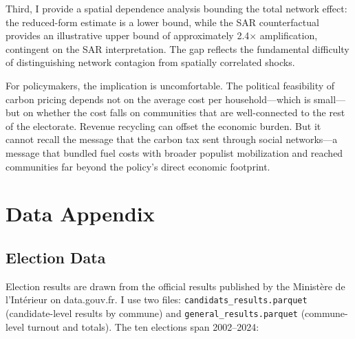 \documentclass[12pt]{article}
\begin{document}
Third, I provide a spatial dependence analysis bounding the total network effect: the reduced-form estimate is a lower bound, while the SAR counterfactual provides an illustrative upper bound of approximately 2.4$\times$ amplification, contingent on the SAR interpretation. The gap reflects the fundamental difficulty of distinguishing network contagion from spatially correlated shocks.

For policymakers, the implication is uncomfortable. The political feasibility of carbon pricing depends not on the average cost per household---which is small---but on whether the cost falls on communities that are well-connected to the rest of the electorate. Revenue recycling can offset the economic burden. But it cannot recall the message that the carbon tax sent through social networks---a message that bundled fuel costs with broader populist mobilization and reached communities far beyond the policy's direct economic footprint.

\label{apep_main_text_end}






\clearpage
\appendix
\setcounter{table}{0}
\renewcommand{\thetable}{A\arabic{table}}
\setcounter{figure}{0}
\renewcommand{\thefigure}{A\arabic{figure}}

\section{Data Appendix}
\label{app:data}

\subsection{Election Data}

Election results are drawn from the official results published by the Minist\`{e}re de l'Int\'{e}rieur on data.gouv.fr. I use two files: \texttt{candidats\_results.parquet} (candidate-level results by commune) and \texttt{general\_results.parquet} (commune-level turnout and totals). The ten elections span 2002--2024:
\end{document}
